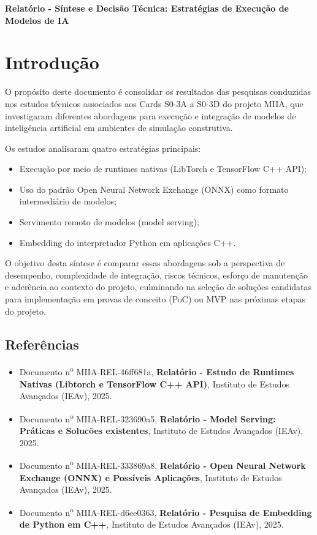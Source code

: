 \begin{center}
    \textbf{\Huge{Relatório - Síntese e Decisão Técnica: Estratégias de Execução de Modelos de IA}}
\end{center}

\section{Introdução}

O propósito deste documento é consolidar os resultados das pesquisas conduzidas nos estudos
técnicos associados aos Cards S0-3A a S0-3D do projeto MIIA, que investigaram diferentes abordagens
para execução e integração de modelos de inteligência artificial em ambientes de simulação
construtiva.

Os estudos analisaram quatro estratégias principais:

\begin{itemize}
\item Execução por meio de runtimes nativas (LibTorch e TensorFlow C++ API);
\item Uso do padrão Open Neural Network Exchange (ONNX) como formato intermediário de modelos;
\item Servimento remoto de modelos (model serving);
\item Embedding do interpretador Python em aplicações C++.
\end{itemize}

O objetivo desta síntese é comparar essas abordagens sob a perspectiva de desempenho,
complexidade de integração, riscos técnicos, esforço de manutenção e aderência ao contexto do
projeto, culminando na seleção de soluções candidatas para implementação em provas de conceito
(PoC) ou MVP nas próximas etapas do projeto.

\subsection{Referências}

\begin{itemize}
    \item Documento n\textsuperscript{o} MIIA-REL-46ff681a, \textbf{Relatório - Estudo de Runtimes Nativas (Libtorch e TensorFlow C++ API)}, Instituto de Estudos Avançados (IEAv), 2025.
    \item Documento n\textsuperscript{o} MIIA-REL-323690a5, \textbf{Relatório - Model Serving: Práticas e Solucões existentes}, Instituto de Estudos Avançados (IEAv), 2025.
    \item Documento n\textsuperscript{o} MIIA-REL-333869a8, \textbf{Relatório - Open Neural Network Exchange (ONNX) e Possíveis Aplicações}, Instituto de Estudos Avançados (IEAv), 2025.
    \item Documento n\textsuperscript{o} MIIA-REL-d6ee0363, \textbf{Relatório - Pesquisa de Embedding de Python em C++}, Instituto de Estudos Avançados (IEAv), 2025.
\end{itemize}

